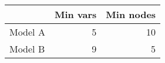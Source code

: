 
\begin{tabular}{l|r|r}
\hline
  & Min vars & Min nodes\\
\hline
Model A & 5 & 10\\
\hline
Model B & 9 & 5\\
\hline
\end{tabular}